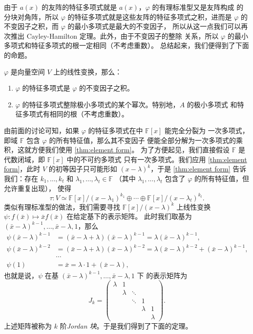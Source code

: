 \documentclass[fontset=none,zihao=-4]{Notes}
\begin{document}
由于 $a(x)$ 的友阵的特征多项式就是 $a(x)$，$\varphi$ 的有理标准型又是友阵构成
的分块对角阵，所以 $\varphi$ 的特征多项式就是这些友阵的特征多项式之积，进而是
$\varphi$ 的不变因子之积，而 $\varphi$ 的最小多项式是最大的不变因子，
所以从这一点我们可以再次推出 Cayley-Hamilton 定理。此外，由于不变因子的整除
关系，所以 $\varphi$ 的最小多项式和特征多项式的根一定相同（不考虑重数）。
总结起来，我们便得到了下面的命题。

\begin{proposition}
  $\varphi$ 是向量空间 $V$ 上的线性变换，那么：
  \begin{enumerate}
    \item $\varphi$ 的特征多项式是 $\varphi$ 的不变因子之积。
    \item $\varphi$ 的特征多项式整除极小多项式的某个幂次。特别地，$A$ 的极小多项式
    和特征多项式有相同的根（不考虑重数）。
  \end{enumerate}
\end{proposition}

由前面的讨论可知，如果 $\varphi$ 的特征多项式在中 $\mathbb{F}[x]$ 能完全分裂为
一次多项式，即域 $\mathbb{F}$ 包含 $\varphi$ 的所有特征值，那么其不变因子
便能全部分解为一次多项式的乘积，这就方便我们使用 \autoref{thm:element form}。
为了方便起见，我们直接假设 $\mathbb{F}$ 是代数闭域，即 $\mathbb{F}[x]$ 中的不可约多项式
只有一次多项式。我们应用 \autoref{thm:element form}，此时 $V$
的初等因子只可能形如 $(x-\lambda)^k$，于是 \autoref{thm:element form}
告诉我们：存在 $k_1,\dots,k_t$ 和 $\lambda_1,\dots,\lambda_t\in\mathbb{F}$
（其中 $\lambda_1,\dots,\lambda_t$ 包含了 $\varphi$ 的所有特征值，但允许重复出现），
使得
\begin{equation}
  \tau:V\simeq \mathbb{F}[x]/(x-\lambda_1)^{k_1}\oplus\cdots\oplus
  \mathbb{F}[x]/(x-\lambda_t)^{k_t}.
\end{equation}
类似有理标准型的做法，我们需要寻找 $\mathbb{F}[x]/(x-\lambda)^k$ 上线性变换
$\psi:f(\bar x)\mapsto \bar xf(\bar x)$ 在给定基下的表示矩阵。
此时我们取基为 $(\bar x-\lambda)^{k-1},\dots,\bar x-\lambda,1$，那么
\begin{align*}
  \psi(\bar x-\lambda)^{k-1}&=(\bar x-\lambda+\lambda)(\bar x-\lambda)^{k-1}
  =\lambda(\bar x-\lambda)^{k-1},\\
  \psi(\bar x-\lambda)^{k-2}&=(\bar x-\lambda+\lambda)(\bar x-\lambda)^{k-2}
  =\lambda(\bar x-\lambda)^{k-2}+(\bar x-\lambda)^{k-1},\\
  &\cdots\\
  \psi(1)&=\bar x=\lambda\cdot 1+(\bar x-\lambda)  ,
\end{align*}
也就是说，$\psi$ 在基 $(\bar x-\lambda)^{k-1},\dots,\bar x-\lambda,1$ 下
的表示矩阵为
\[
  J_k=
  \begin{pmatrix}
    \lambda & 1 & & & \\
    & \lambda & \ddots & & \\
    & & \ddots & 1 &  \\
    & & & \lambda & 1 \\
    & & & & \lambda
  \end{pmatrix}  .
\]
上述矩阵被称为 $k$ 阶\emph{Jordan 块}。于是我们得到了下面的定理。
\end{document}
